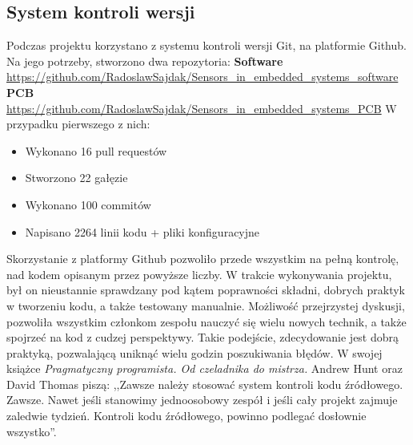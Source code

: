 \subsection{System kontroli wersji}
Podczas projektu korzystano z systemu kontroli wersji Git, na platformie Github. Na jego potrzeby, stworzono dwa repozytoria:\newline
\textbf{Software}\newline
\url{https://github.com/RadoslawSajdak/Sensors_in_embedded_systems_software}\newline
\textbf{PCB}\newline
\url{https://github.com/RadoslawSajdak/Sensors_in_embedded_systems_PCB}\newline
\newline
W przypadku pierwszego z nich:
\begin{itemize}
    \item Wykonano 16 pull requestów
    \item Stworzono 22 gałęzie
    \item Wykonano 100 commitów
    \item Napisano 2264 linii kodu + pliki konfiguracyjne
\end{itemize}
Skorzystanie z platformy Github pozwoliło przede wszystkim na pełną kontrolę, nad kodem opisanym przez powyższe liczby. W trakcie wykonywania projektu, był on nieustannie sprawdzany pod kątem poprawności składni, dobrych praktyk w tworzeniu kodu, a także testowany manualnie. Możliwość przejrzystej dyskusji, pozwoliła wszystkim członkom zespołu nauczyć się wielu nowych technik, a także spojrzeć na kod z cudzej perspektywy. Takie podejście, zdecydowanie jest dobrą praktyką, pozwalającą uniknąć wielu godzin poszukiwania błędów. W swojej książce \textit{Pragmatyczny programista. Od czeladnika do mistrza.} Andrew Hunt oraz David Thomas piszą: ,,Zawsze należy stosować system kontroli kodu źródłowego. Zawsze. Nawet jeśli stanowimy jednoosobowy zespół i jeśli cały projekt zajmuje zaledwie tydzień. Kontroli kodu źródłowego, powinno podlegać dosłownie wszystko''\cite{pragmatic}.